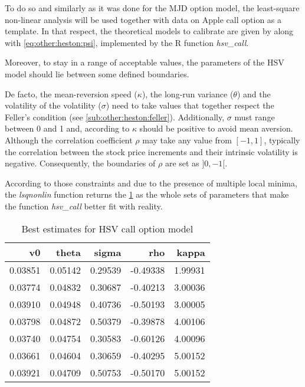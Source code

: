 \documentclass[12pt,a4paper]{report}
\begin{document}
To do so and similarly as it was done for the MJD option model, the least-square non-linear analysis will be used together with data on Apple call option as a template.
In that respect, the theoretical models to calibrate are given by  along with \cref{eq:other:heston:psi}, implemented by the R function \textit{hsv\_call}.

Moreover, to stay in a range of acceptable values, the parameters of the HSV model should lie between some defined boundaries. 

De facto, the mean-reversion speed ($\kappa$), the long-run variance ($\theta$) and the volatility of the volatility ($\sigma$) need to take values that together respect the Feller's condition (see \cref{sub:other:heston:feller}). 
Additionally, $\sigma$ must range between 0 and 1 and, according to \citet{cristo2015} $\kappa$ should be positive to avoid mean aversion.
Although the correlation coefficient $\rho$ may take any value from $[-1, 1]$, typically the correlation between the stock price increments and their intrinsic volatility is negative. Consequently, the boundaries of $\rho$ are set as $]0, -1[$.

According to those constraints and due to the presence of multiple local minima, the \textit{lsqnonlin} function returns the \cref{t:methodology:call:heston:estimate1} as the whole sets of parameters that make the function \textit{hsv\_call} better fit with reality.

\begin{table}[h]
\centering
\begin{tabular}{rrrrr}
  \hline
v0 & theta & sigma & rho & kappa \\ 
  \hline
  0.03851 & 0.05142 & 0.29539 & -0.49338 & 1.99931 \\ 
  0.03774 & 0.04832 & 0.30687 & -0.40213 & 3.00036 \\ 
  0.03910 & 0.04948 & 0.40736 & -0.50193 & 3.00005 \\ 
  0.03798 & 0.04872 & 0.50379 & -0.39878 & 4.00106 \\
  0.03740 & 0.04754 & 0.30583 & -0.60126 & 4.00096 \\ 
  0.03661 & 0.04604 & 0.30659 & -0.40295 & 5.00152 \\ 
  0.03921 & 0.04709 & 0.50753 & -0.50170 & 5.00152 \\ 
   \hline
\end{tabular}
\caption{Best estimates for HSV call option model} 
\label{t:methodology:call:heston:estimate1}
\end{table}
\end{document}
